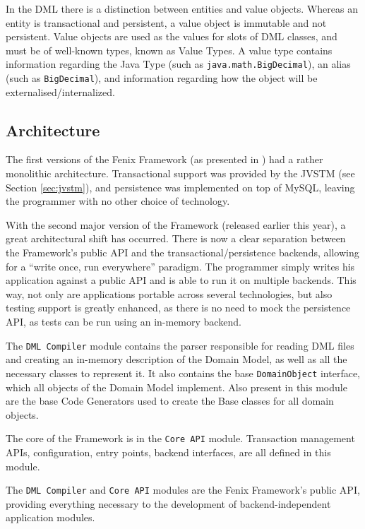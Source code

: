 \documentclass{llncs}
\begin{document}
In the DML there is a distinction between entities and value
objects. Whereas an entity is transactional and persistent, a value
object is immutable and not persistent. Value objects are used as the
values for slots of DML classes, and must be of well-known types,
known as Value Types. A value type contains information regarding the
Java Type (such as \texttt{java.math.BigDecimal}), an alias (such as
\texttt{BigDecimal}), and information regarding how the object will be
externalised/internalized.

\subsection{Architecture}
\label{sec:ff-arch}

The first versions of the Fenix Framework (as presented in
\cite{fernandes2011strict}) had a rather monolithic
architecture. Transactional support was provided by the JVSTM (see
Section \ref{sec:jvstm}), and persistence was implemented on top of
MySQL, leaving the programmer with no other choice of technology.

With the second major version of the Framework (released earlier this
year), a great architectural shift has occurred. There is now a clear
separation between the Framework's public API and the
transactional/persistence backends, allowing for a ``write once, run
everywhere'' paradigm. The programmer simply writes his application
against a public API and is able to run it on multiple backends. This
way, not only are applications portable across several technologies,
but also testing support is greatly enhanced, as there is no need to
mock the persistence API, as tests can be run using an in-memory
backend.

The \texttt{DML Compiler} module contains the parser responsible for reading
DML files and creating an in-memory description of the Domain Model,
as well as all the necessary classes to represent it. It also contains
the base \texttt{DomainObject} interface, which all objects of the Domain
Model implement. Also present in this module are the base Code
Generators used to create the Base classes for all domain
objects.

The core of the Framework is in the \texttt{Core API} module. Transaction
management APIs, configuration, entry points, backend interfaces, are
all defined in this module.

The \texttt{DML Compiler} and \texttt{Core API} modules are the Fenix
Framework's public API, providing everything necessary to the
development of backend-independent application modules.
\end{document}
